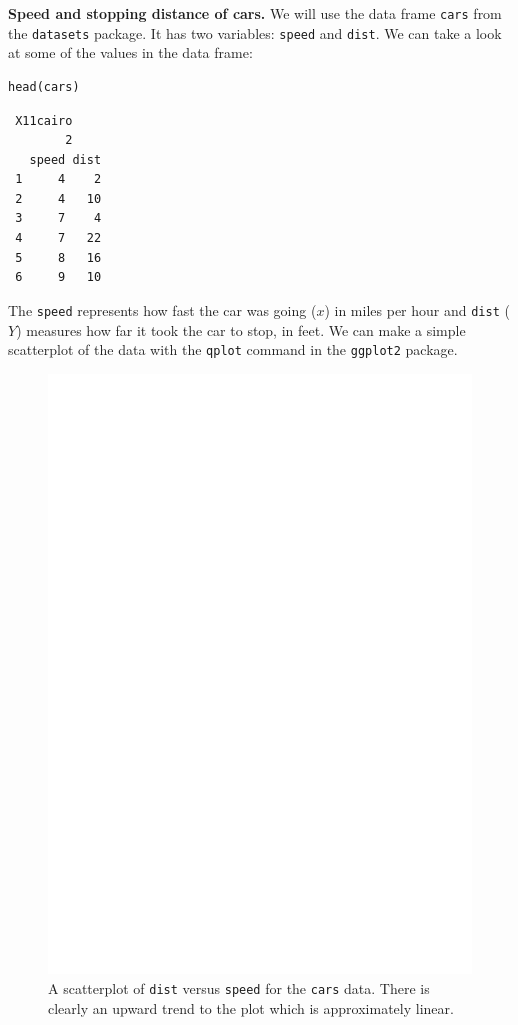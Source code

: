 \documentclass[captions=tableheading]{scrbook}
\begin{document}
\begin{example}
\label{exa:Speed-and-Stopping}
\textbf{Speed and stopping distance of cars.} We will use the data frame \texttt{cars} from the \texttt{datasets} package. It has two variables: \texttt{speed} and \texttt{dist}. We can take a look at some of the values in the data frame: 

\begin{verbatim}
head(cars)
\end{verbatim}

\begin{verbatim}
 X11cairo 
        2
   speed dist
 1     4    2
 2     4   10
 3     7    4
 4     7   22
 5     8   16
 6     9   10
\end{verbatim}

The \texttt{speed} represents how fast the car was going (\(x\)) in miles per hour and \texttt{dist} (\(Y\)) measures how far it took the car to stop, in feet. We can make a simple scatterplot of the data with the \texttt{qplot} command in the \texttt{ggplot2} package. 

\begin{figure}[th]
  \includegraphics[angle=270, totalheight=4in]{ps/carscatter.ps}
  \caption[Scatterplot of \texttt{dist} versus \texttt{speed} for the \texttt{cars} data]{\small A scatterplot of \texttt{dist} versus \texttt{speed} for the \texttt{cars} data.  There is clearly an upward trend to the plot which is approximately linear.}
  \label{fig:Scatter-cars}
\end{figure}



\end{example}
\end{document}
